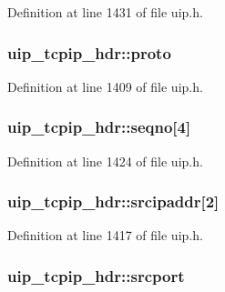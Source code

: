 Definition at line 1431 of file uip.h.

\hypertarget{structuip__tcpip__hdr_ae45b31a0a277dd5325ad2a332358b21b}{
\subsubsection[{proto}]{ {\bf uip\_\-tcpip\_\-hdr::proto}}}
\label{structuip__tcpip__hdr_ae45b31a0a277dd5325ad2a332358b21b}


Definition at line 1409 of file uip.h.

\hypertarget{structuip__tcpip__hdr_a2541fae506eb111ff1be2372e0919839}{
\subsubsection[{seqno}]{ {\bf uip\_\-tcpip\_\-hdr::seqno}\mbox{[}4\mbox{]}}}
\label{structuip__tcpip__hdr_a2541fae506eb111ff1be2372e0919839}


Definition at line 1424 of file uip.h.

\hypertarget{structuip__tcpip__hdr_ac8f124419a231f38bb6cdf5041757a27}{
\subsubsection[{srcipaddr}]{ {\bf uip\_\-tcpip\_\-hdr::srcipaddr}\mbox{[}2\mbox{]}}}
\label{structuip__tcpip__hdr_ac8f124419a231f38bb6cdf5041757a27}


Definition at line 1417 of file uip.h.

\hypertarget{structuip__tcpip__hdr_aa81fff4836049cb3c018304d77337554}{
\subsubsection[{srcport}]{ {\bf uip\_\-tcpip\_\-hdr::srcport}}}
\label{structuip__tcpip__hdr_aa81fff4836049cb3c018304d77337554}


